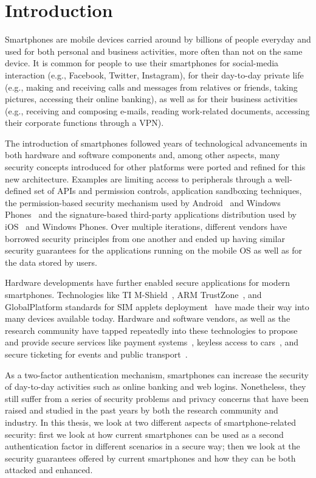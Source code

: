 \chapter{Introduction}

Smartphones are mobile devices carried around by billions of people everyday and used for both personal and business activities, more often than not on the same device. It is common for people to use their smartphones for social-media interaction (e.g., Facebook, Twitter, Instagram), for their day-to-day private life (e.g., making and receiving calls and messages from relatives or friends, taking pictures, accessing their online banking), as well as for their business activities (e.g., receiving and composing e-mails, reading work-related documents, accessing their corporate functions through a VPN).

The introduction of smartphones followed years of technological advancements in both hardware and software components and, among other aspects, many security concepts introduced for other platforms were ported and refined for this new architecture. Examples are limiting access to peripherals through a well-defined set of APIs and permission controls, application sandboxing techniques, the permission-based security mechanism used by Android~\cite{androidsecurity} and Windows Phones~\cite{windowssecurity} and the signature-based third-party applications distribution used by iOS~\cite{applesecurity} and Windows Phones. Over multiple iterations, different vendors have borrowed security principles from one another and ended up having similar security guarantees for the applications running on the mobile OS as well as for the data stored by users.

Hardware developments have further enabled secure applications for modern smartphones. Technologies like TI M-Shield~\cite{mshield}, ARM TrustZone~\cite{ARMTrustZone}, and GlobalPlatform standards for SIM applets deployment~\cite{globalplatformspecs} have made their way into many devices available today. Hardware and software vendors, as well as the research community have tapped repeatedly into these technologies to propose and provide secure services like payment systems~\cite{proxama}, keyless access to cars~\cite{busold2013codaspy}, and secure ticketing for events and public transport~\cite{tamrakar2011stc,tamrakar2013trust}.

As a two-factor authentication mechanism, smartphones can increase the security of day-to-day activities such as online banking and web logins. Nonetheless, they still suffer from a series of security problems and privacy concerns that have been raised and studied in the past years by both the research community and industry. In this thesis, we look at two different aspects of smartphone-related security: first we look at how current smartphones can be used as a second authentication factor in different scenarios in a secure way; then we look at the security guarantees offered by current smartphones and how they can be both attacked and enhanced.

